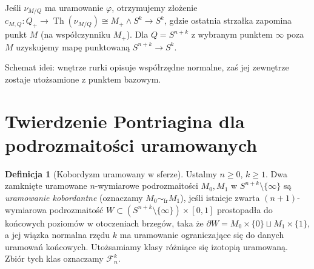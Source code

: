 \documentclass[11pt,a4paper,oneside]{report}
\theoremstyle{plain}
\theoremstyle{definition}
\newtheorem{definicja}[twierdzenie]{Definicja}
\theoremstyle{remark}
\begin{document}
Jeśli $\nu_{M/Q}$ ma uramowanie $\varphi$, otrzymujemy
złożenie
$c_{M,Q}:Q_+\to\operatorname{Th}(\nu_{M/Q})
\cong M_+\wedge S^k\to S^k$, gdzie ostatnia strzałka
zapomina punkt $M$ (na współczynniku $M_+$).
Dla $Q=S^{n+k}$ z wybranym punktem $\infty$ poza $M$
uzyskujemy mapę punktowaną $S^{n+k}\to S^k$.

\begin{center}
\end{center}
\begin{center}\small Schemat idei: wnętrze rurki opisuje współrzędne normalne,
zaś jej zewnętrze zostaje utożsamione z punktem bazowym.\end{center}

\section{Twierdzenie Pontriagina dla podrozmaitości uramowanych}
\begin{definicja}[Kobordyzm uramowany w sferze]
Ustalmy $n\ge0$, $k\ge1$. Dwa zamknięte uramowane
$n$-wymiarowe podrozmaitości $M_0,M_1$ w
$S^{n+k}\setminus\{\infty\}$ są \emph{uramowanie kobordantne}
(oznaczamy $M_0\sim_{\mathrm{fr}}M_1$), jeśli istnieje
zwarta $(n+1)$-wymiarowa podrozmaitość
$W\subset(S^{n+k}\setminus\{\infty\})\times[0,1]$
prostopadła do końcowych poziomów w otoczeniach brzegów,
taka że
$\partial W=M_0\times\{0\}\sqcup M_1\times\{1\}$,
a jej wiązka normalna rzędu $k$ ma uramowanie
ograniczające się do danych uramowań końcowych.
Utożsamiamy klasy różniące się izotopią uramowaną.
Zbiór tych klas oznaczamy $\mathcal F_n^k$.
\end{definicja}
\end{document}
